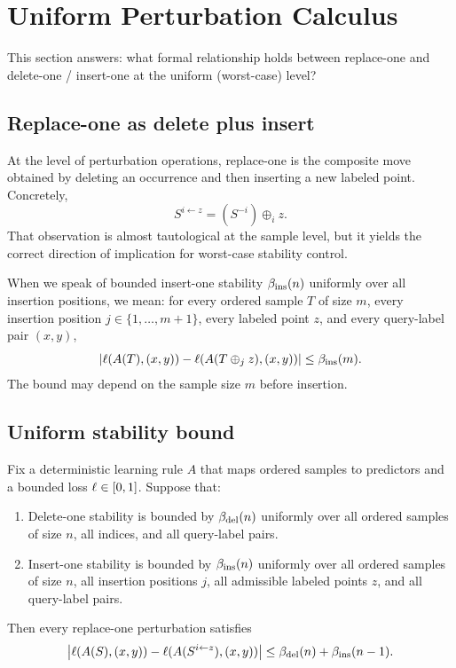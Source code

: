 \section{Uniform Perturbation Calculus}
\label{sec:uniform-calculus}

This section answers: what formal relationship holds between replace-one and
delete-one / insert-one at the uniform (worst-case) level?

\subsection{Replace-one as delete plus insert}

At the level of perturbation operations, replace-one is the composite move
obtained by deleting an occurrence and then inserting a new labeled point.
Concretely,
\[
S^{i \leftarrow z} = (S^{-i}) \oplus_i z.
\]
That observation is almost tautological at the sample level, but it yields the
correct direction of implication for worst-case stability control.

\begin{note}
When we speak of bounded insert-one stability $\beta_{\mathrm{ins}}(n)$ uniformly over
all insertion positions, we mean: for every ordered sample $T$ of size $m$,
every insertion position $j \in \{1,\ldots,m+1\}$, every labeled point $z$, and
every query-label pair $(x,y)$,
\[
\left|\ell(A(T),(x,y)) - \ell(A(T \oplus_j z),(x,y))\right| \le \beta_{\mathrm{ins}}(m).
\]
The bound may depend on the sample size $m$ before insertion.
\end{note}

\subsection{Uniform stability bound}

\begin{proposition}
\label{prop:4.1}
Fix a deterministic learning rule $A$ that maps ordered samples to predictors
and a bounded loss $\ell \in [0,1]$.  Suppose that:
\begin{enumerate}[leftmargin=*,label=(\arabic*)]
    \item Delete-one stability is bounded by $\beta_{\mathrm{del}}(n)$ uniformly over
        all ordered samples of size $n$, all indices, and all query-label
        pairs.
    \item Insert-one stability is bounded by $\beta_{\mathrm{ins}}(n)$ uniformly over
        all ordered samples of size $n$, all insertion positions $j$, all
        admissible labeled points $z$, and all query-label pairs.
\end{enumerate}
Then every replace-one perturbation satisfies
\[
\left|\ell(A(S),(x,y))-\ell(A(S^{i\leftarrow z}),(x,y))\right|
\le \beta_{\mathrm{del}}(n)+\beta_{\mathrm{ins}}(n-1).
\]
\end{proposition}

